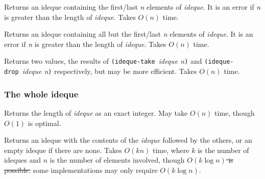 \begin{entry}{%
  }

  Returns an ideque containing the first/last \emph{n} elements of
  \emph{ideque}. It is an error if \emph{n} is greater than the length
  of \emph{ideque}. Takes $O(n)$ time.
\end{entry}

\begin{entry}{%
  }

  Returns an ideque containing all but the first/last \emph{n}
  elements of \emph{ideque}. It is an error if \emph{n} is greater
  than the length of \emph{ideque}. Takes $O(n)$ time.
\end{entry}

\begin{entry}{%
  }

Returns two values, the results of \texttt{(ideque-take}~\emph{ideque
  n}\texttt{)} and \texttt{(ideque-drop\ }\emph{ideque n}\texttt{)}
respectively, but may be more efficient. Takes $O(n)$ time.
\end{entry}

\subsubsection{The whole ideque}

\begin{entry}{%
  }

  Returns the length of \emph{ideque} as an exact integer. May take
  $O(n)$ time, though $O(1)$ is optimal.  
\end{entry}

\begin{entry}{%
  }

  Returns an ideque with the contents of the \emph{ideque} followed by
  the others, or an empty ideque if there are none. Takes $O(kn)$ time,
  where $k$ is the number of ideques and $n$ is the number of elements
  involved, though \st{$O(k \log n)$ is possible.} some
    implementations may only require $O(k \log n)$. 
\end{entry}

